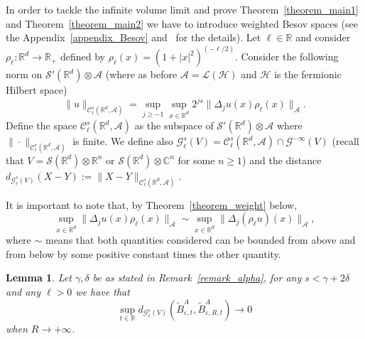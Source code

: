 \documentclass{article}
\newcommand{\assign}{:=}
\newtheorem{lemma}[theorem]{Lemma}
\begin{document}
In order to tackle the infinite volume limit and prove
Theorem~\ref{theorem_main1} and Theorem~\ref{theorem_main2} we have to
introduce weighted Besov spaces (see the Appendix~\ref{appendix_Besov}
and~{\cite{TriebelIII}} for the details). Let $\ell \in \mathbb{R}$ and
consider $\rho_{\ell} : \mathbb{R}^d \rightarrow \mathbb{R}_+$ defined by
$\rho_{\ell} (x) = (1 + | x |^2)^{(- \ell / 2)}$. Consider the following norm
on $\mathcal{S}' (\mathbb{R}^d) \otimes \mathcal{A}$ (where as before
$\mathcal{A} = \mathcal{L} (\mathcal{H})$ and $\mathcal{H}$ is the fermionic
Hilbert space)
\[ \| u \|_{\mathcal{C}^s_{\ell} (\mathbb{R}^d, \mathcal{A})} = \sup_{j
   \geqslant - 1} \sup_{x \in \mathbb{R}^d} 2^{j s} \| \Delta_j u (x)
   \rho_{\ell} (x) \|_{\mathcal{A}} . \]
Define the space $\mathcal{C}^s_{\ell} (\mathbb{R}^d, \mathcal{A})$ as the
subspace of $\mathcal{S}' (\mathbb{R}^d) \otimes \mathcal{A}$ where $\| \cdot
\|_{\mathcal{C}^s_{\ell} (\mathbb{R}^d, \mathcal{A})}$ is finite. We define
also $\mathcal{G}^s_{\ell} (V) = \mathcal{C}^s_{\ell} (\mathbb{R}^d,
\mathcal{A}) \cap \mathcal{G}^{- \infty} (V)$ (recall that $V =\mathcal{S}
(\mathbb{R}^d) \otimes \mathbb{R}^n$ or $\mathcal{S} (\mathbb{R}^d) \otimes
\mathbb{C}^n$ for some $n \geqslant 1$) and the distance
$d_{\mathcal{G}^s_{\ell} (V)} (X - Y) \assign \| X - Y
\|_{\mathcal{C}^s_{\ell} (\mathbb{R}^d, \mathcal{A})}$.

\begin{remark}
  \label{remark_weight}It is important to note that, by
  Theorem~\ref{theorem_weight} below,
  \[ \sup_{x \in \mathbb{R}^d} \| \Delta_j u (x) \rho_{\ell} (x)
     \|_{\mathcal{A}} \sim \sup_{x \in \mathbb{R}^d} \| \Delta_j (\rho_{\ell}
     u) (x) \|_{\mathcal{A}}, \]
  where $\sim$ means that both quantities considered can be bounded from above
  and from below by some positive constant times the other quantity.
\end{remark}

\begin{lemma}
  \label{lemma_convergenceB}Let $\gamma, \delta$ be as stated in
  Remark~\ref{remark_alpha}, for any $s < \gamma + 2 \delta$ and any $\ell >
  0$ we have that
  \[ \sup_{t \in \mathbb{R}} d_{\mathcal{G}^s_{\ell} (V)}
     (\tilde{B}_{\varepsilon, t}^A, \tilde{B}^A_{\varepsilon, R, t})
     \rightarrow 0 \]
  when $R \rightarrow + \infty$.
\end{lemma}
\end{document}
